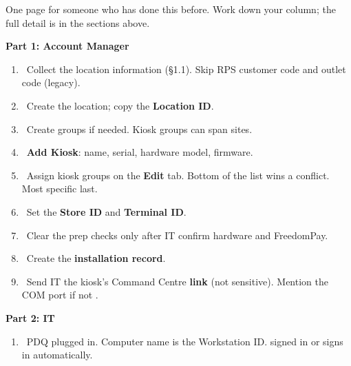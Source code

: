 \documentclass[a4paper,10pt]{article}
\begin{document}
One page for someone who has done this before. Work down your column;
the full detail is in the sections above.

\begin{center}
\begin{minipage}[t]{0.475\textwidth}
\colorbox{weknowsky}{\parbox{\dimexpr\textwidth-2\fboxsep}{%
  \vspace{2pt}\centering\bfseries\color{weknownight}
  Part 1: Account Manager\vspace{2pt}}}
\vspace{4pt}
\footnotesize
\begin{enumerate}[leftmargin=6mm,itemsep=3pt]
  \item \emptybox\ Collect the location information (\S1.1). Skip RPS
        customer code and outlet code (legacy).
  \item \emptybox\ Create the location; copy the \textbf{Location ID}.
  \item \emptybox\ Create groups if needed. Kiosk groups can span sites.
  \item \emptybox\ \textbf{Add Kiosk}: name, serial, hardware model,
        firmware.
  \item \emptybox\ Assign kiosk groups on the \textbf{Edit} tab.
        Bottom of the list wins a conflict. Most specific last.
  \item \emptybox\ Set the \textbf{Store ID} and \textbf{Terminal ID}.
  \item \emptybox\ Clear the prep checks only after IT confirm
        hardware and FreedomPay.
  \item \emptybox\ Create the \textbf{installation record}.
  \item \emptybox\ Send IT the kiosk's Command Centre \textbf{link}
        (not sensitive). Mention the COM port if not .
\end{enumerate}
\end{minipage}\hfill
\begin{minipage}[t]{0.475\textwidth}
\colorbox{weknowgreyL}{\parbox{\dimexpr\textwidth-2\fboxsep}{%
  \vspace{2pt}\centering\bfseries\color{weknownight}
  Part 2: IT\vspace{2pt}}}
\vspace{4pt}
\footnotesize
\begin{enumerate}[leftmargin=6mm,itemsep=3pt]
  \item \emptybox\ PDQ plugged in. Computer name is the Workstation ID.
         signed in or signs in automatically.

\end{enumerate}
\end{minipage}
\end{center}
\end{document}
